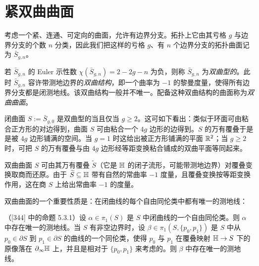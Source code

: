 
\section{紧双曲曲面}

考虑一个紧、连通、可定向的曲面，允许有边界分支。拓扑上它由其亏格 $g$ 与边界分支的个数 $n$ 分类，因此我们把这样的亏格 $g$、有 $n$ 个边界分支的拓扑曲面记为 $\bar S_{g,n}$。

若 $\bar S_{g,n}$ 的 Euler 示性数 $\chi(\bar S_{g,n})=2-2g-n$ 为负，则称 $\bar S_{g,n}$ 为\emph{双曲型的}。此时 $\bar S_{g,n}$ 容许带测地边界的\emph{双曲结构}，即一个曲率为 $-1$ 的黎曼度量，使得所有边界分支都是闭测地线。该双曲结构一般并不唯一。配备这种双曲结构的曲面称为\emph{双曲曲面}。

闭曲面 $S:=\bar S_{g,0}$ 是双曲型的当且仅当 $g\ge 2$。这可如下看出：类似于环面可由粘合正方形的对边得到，曲面 $S$ 可由粘合一个 $4g$ 边形的边得到。$S$ 的万有覆叠于是是被 $4g$ 边形铺满的空间。当 $g=1$ 时这给出被正方形铺满的平面 $\mathbb{R}^2$；当 $g\ge 2$ 时，可把 $S$ 的万有覆叠与由 $4g$ 边形经等距变换粘合铺成的双曲平面等同起来。


双曲曲面 $S$ 可由其万有覆叠 $\widetilde{S}$（它是 $\mathbb{H}$ 的闭子流形，可能带测地边界）对覆叠变换取商而还原。由于 $\widetilde{S}\subseteq\mathbb{H}$ 带有自然的常曲率 $-1$ 度量，且覆叠变换按等距变换作用，这在商 $S$ 上给出常曲率 $-1$ 的度量。

双曲曲面的一个重要性质是：在闭曲线的每个自由同伦类中都有唯一的测地线：

\begin{proposition}[4.4]
（[344] 中的命题 5.3.1）\quad 设 $\alpha\in\pi_1(S)$ 是 $S$ 中闭曲线的一个自由同伦类。则 $\alpha$ 中存在唯一的测地线。当 $S$ 有非空边界时，设 $\beta\in\pi_1(S,\{p_0,p_1\})$ 是 $S$ 中从 $p_0\in\partial S$ 到 $p_1\in\partial S$ 的曲线的一个同伦类，使得 $p_0$ 与 $p_1$ 在覆叠映射 $\mathbb{H}\to S$ 下的原像落在 $\partial_\infty\mathbb{H}$ 上，并且是相对于 $\{p_0,p_1\}$ 来考虑的。则 $\beta$ 中存在唯一的测地线。
\end{proposition}

